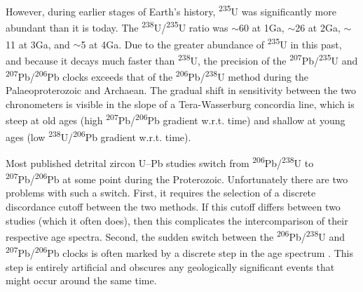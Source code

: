 \documentclass[gchron, manuscript]{copernicus}
\begin{document}
However, during earlier stages of Earth's history,
\textsuperscript{235}U was significantly more abundant than it is
today. The \textsuperscript{238}U/\textsuperscript{235}U ratio was
$\sim$60 at 1Ga, $\sim$26 at 2Ga, $\sim$11 at 3Ga, and $\sim$5 at 4Ga.
Due to the greater abundance of \textsuperscript{235}U in this past,
and because it decays much faster than \textsuperscript{238}U, the
precision of the \textsuperscript{207}Pb/\textsuperscript{235}U and
\textsuperscript{207}Pb/\textsuperscript{206}Pb clocks exceeds that of
the \textsuperscript{206}Pb/\textsuperscript{238}U method during the
Palaeoproterozoic and Archaean. The gradual shift in sensitivity
between the two chronometers is visible in the slope of a
Tera-Wasserburg concordia line, which is steep at old ages (high
\textsuperscript{207}Pb/\textsuperscript{206}Pb gradient w.r.t. time)
and shallow at young ages (low
\textsuperscript{238}U/\textsuperscript{206}Pb gradient
w.r.t. time).

Most published detrital zircon U--Pb studies switch from
\textsuperscript{206}Pb/\textsuperscript{238}U to
\textsuperscript{207}Pb/\textsuperscript{206}Pb at some point during
the Proterozoic. Unfortunately there are two problems with such a
switch. First, it requires the selection of a discrete discordance
cutoff between the two methods. If this cutoff differs between two
studies (which it often does), then this complicates the
intercomparison of their respective age spectra. Second, the sudden
switch between the \textsuperscript{206}Pb/\textsuperscript{238}U and
\textsuperscript{207}Pb/\textsuperscript{206}Pb clocks is often marked
by a discrete step in the age spectrum \citep{puetz2018}. This step is
entirely artificial and obscures any geologically significant events
that might occur around the same time.
\end{document}
